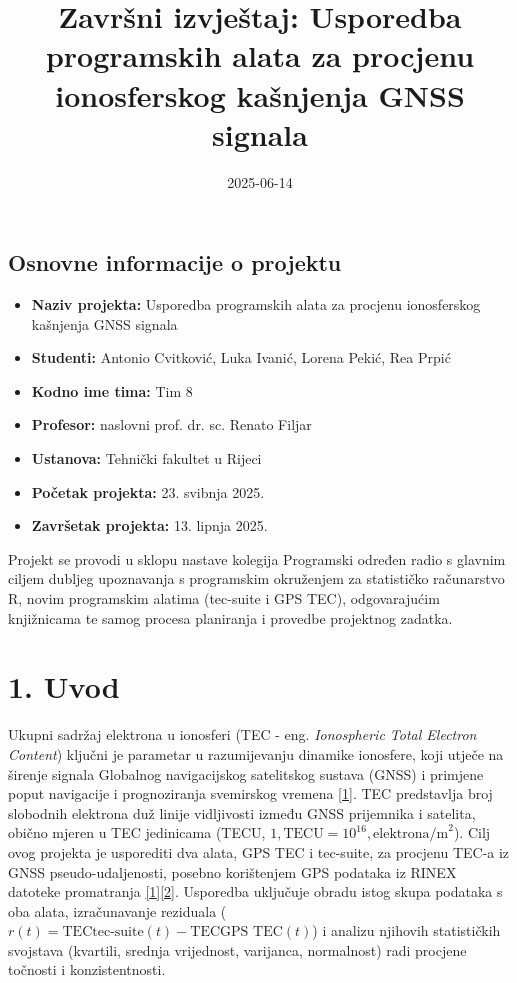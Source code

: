 \documentclass[
]{article}
\title{Završni izvještaj: Usporedba programskih alata za procjenu
ionosferskog kašnjenja GNSS signala}
\author{}
\date{\vspace{-2.5em}2025-06-14}
\providecommand{\tightlist}{%
  \setlength{\itemsep}{0pt}\setlength{\parskip}{0pt}}
\begin{document}
\maketitle

\subsection{Osnovne informacije o
projektu}\label{osnovne-informacije-o-projektu}

\begin{itemize}
\tightlist
\item
  \textbf{Naziv projekta:} Usporedba programskih alata za procjenu
  ionosferskog kašnjenja GNSS signala
\item
  \textbf{Studenti:} Antonio Cvitković, Luka Ivanić, Lorena Pekić, Rea
  Prpić
\item
  \textbf{Kodno ime tima:} Tim 8
\item
  \textbf{Profesor:} naslovni prof. dr. sc. Renato Filjar
\item
  \textbf{Ustanova:} Tehnički fakultet u Rijeci
\item
  \textbf{Početak projekta:} 23. svibnja 2025.
\item
  \textbf{Završetak projekta:} 13. lipnja 2025.
\end{itemize}

Projekt se provodi u sklopu nastave kolegija Programski određen radio s
glavnim ciljem dubljeg upoznavanja s programskim okruženjem za
statističko računarstvo R, novim programskim alatima (tec-suite i GPS
TEC), odgovarajućim knjižnicama te samog procesa planiranja i provedbe
projektnog zadatka.

\section{1. Uvod}\label{uvod}

Ukupni sadržaj elektrona u ionosferi (TEC - eng. \emph{Ionospheric Total
Electron Content}) ključni je parametar u razumijevanju dinamike
ionosfere, koji utječe na širenje signala Globalnog navigacijskog
satelitskog sustava (GNSS) i primjene poput navigacije i prognoziranja
svemirskog vremena \hyperref[izvori]{{[}1{]}}. TEC predstavlja broj
slobodnih elektrona duž linije vidljivosti između GNSS prijemnika i
satelita, obično mjeren u TEC jedinicama (TECU,
\(1 , \text{TECU} = 10^{16} , \text{elektrona/m}^2\)). Cilj ovog
projekta je usporediti dva alata, GPS TEC i tec-suite, za procjenu TEC-a
iz GNSS pseudo-udaljenosti, posebno korištenjem GPS podataka iz RINEX
datoteke promatranja \hyperref[izvori]{{[}1{]}{[}2{]}}. Usporedba
uključuje obradu istog skupa podataka s oba alata, izračunavanje
reziduala
(\(r(t) = \text{TEC}{\text{tec-suite}}(t) - \text{TEC}{\text{GPS TEC}}(t)\))
i analizu njihovih statističkih svojstava (kvartili, srednja vrijednost,
varijanca, normalnost) radi procjene točnosti i konzistentnosti.
\end{document}
